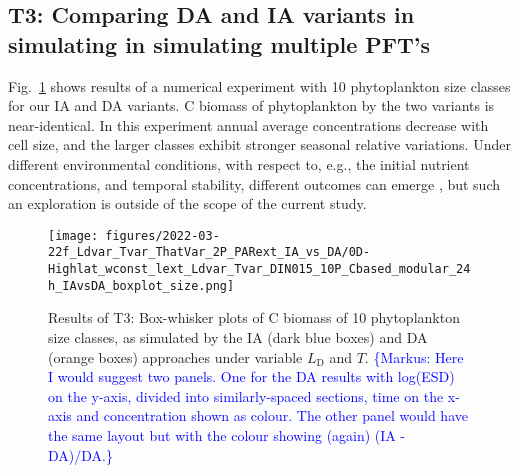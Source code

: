 \documentclass[gmd, manuscript]{copernicus}
\newcommand{\onur}[1]{\textcolor{blue}{\{Onur: #1\}}}
\newcommand{\markus}[1]{\textcolor{blue}{\{Markus: #1\}}}
\begin{document}
\FloatBarrier%
\subsection{T3: Comparing DA and IA variants in simulating in simulating multiple PFT's}\label{s.resT3}

Fig.~\ref{f.T3res} shows results of a numerical experiment with 10 phytoplankton size classes for our IA and DA variants. C biomass of phytoplankton by the two variants is near-identical. In this experiment annual average concentrations decrease with cell size, and the larger classes exhibit stronger seasonal relative variations. Under different environmental conditions, with respect to, e.g., the initial nutrient concentrations, and temporal stability, different outcomes can emerge \citep[see, e.g.,][]{Taherzadeh2017}, but such an exploration is outside of the scope of the current study.

\begin{figure}[ht!]
\texttt{[image: figures/2022-03-22f\_Ldvar\_Tvar\_ThatVar\_2P\_PARext\_IA\_vs\_DA/0D-Highlat\_wconst\_lext\_Ldvar\_Tvar\_DIN015\_10P\_Cbased\_modular\_24h\_IAvsDA\_boxplot\_size.png]}
\caption{Results of T3: Box-whisker plots of C biomass of 10 phytoplankton size classes, as simulated by the IA (dark blue boxes) and DA (orange boxes) approaches under variable $L_{\text{D}}$ and $T$.  \markus{Here I would suggest two panels.  One for the DA results with log(ESD) on the y-axis, divided into similarly-spaced sections, time on the x-axis and concentration shown as colour.  The other panel would have the same layout but with the colour showing (again) (IA - DA)/DA.}\label{f.T3res}}
\end{figure}

\end{document}
